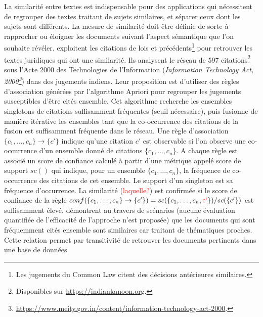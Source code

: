 La similarité entre textes est indispensable pour des applications qui nécessitent de regrouper des textes traitant de sujets similaires, et séparer ceux dont les sujets sont différents. La  mesure de similarité doit être définie de sorte à rapprocher ou éloigner les documents suivant l'aspect sémantique que l'on souhaite révéler. \citet{nair2018judgsimassorule} exploitent les citations de lois et précédents\footnote{Les jugements du \og Common Law \fg{} citent des décisions antérieures similaires.} pour retrouver les textes juridiques qui ont une similarité. Ils analysent le réseau de 597 citations\footnote{Disponibles sur \url{https://indiankanoon.org}.} sous l'Acte 2000 des Technologies de l'Information (\textit{Information Technology Act, 2000\footnote{\url{https://www.meity.gov.in/content/information-technology-act-2000}.}}) dans des jugements indiens. Leur proposition est d'utiliser des règles d'association générées par l'algorithme Apriori \citep{agrawal1994algoApriori} pour regrouper les jugements susceptibles d'être cités ensemble. Cet algorithme recherche les ensembles singletons de citations suffisamment fréquentes (seuil nécessaire), puis fusionne de manière itérative les ensembles tant que la co-occurrence des citations de la fusion est suffisamment fréquente dans le réseau. Une règle d'association $\lbrace c_1,\dots,c_n \rbrace \rightarrow \lbrace c' \rbrace$ indique qu'une citation $c'$ est observable si l'on observe une co-occurrence d'un ensemble donné de citations $\lbrace c_1,\dots,c_n \rbrace$. A chaque règle est associé un score de confiance calculé à partir d'une métrique appelé score de support $sc()$ qui indique, pour un ensemble $\lbrace c_1,\dots,c_n \rbrace$, la fréquence de co-occurrence des citations de cet ensemble. Le support d'un singleton est sa fréquence d'occurrence. La similarité (\textcolor{red}{laquelle?}) est confirmée si le score de confiance de la règle  $conf(\lbrace c_1,\dots,c_n \rbrace \rightarrow \lbrace c' \rbrace) = sc(\lbrace c_1,\dots,c_n, \text{\textcolor{red}{c'}} \rbrace) / sc(\lbrace c' \rbrace)$ est suffisamment élevé.
\citet{nair2018judgsimassorule} démontrent au travers de scénarios (aucune évaluation quantifiée de l'efficacité de l'approche n'est proposée) que les documents qui sont fréquemment cités ensemble sont similaires car traitant de thématiques proches. Cette relation permet par transitivité de retrouver les documents pertinents dans une base de données. 

